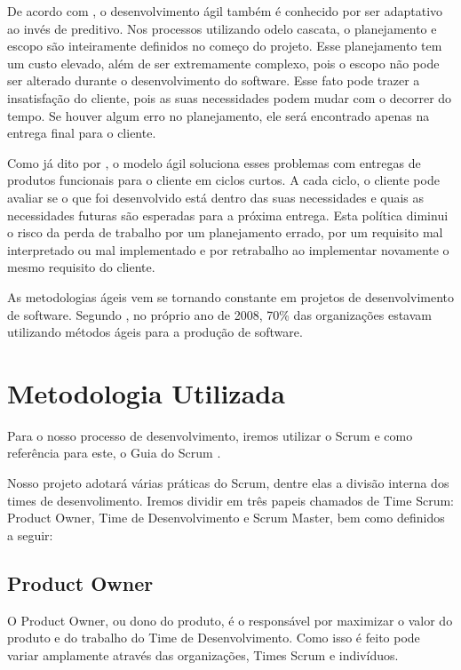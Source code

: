 De acordo com \cite{soares}, o desenvolvimento ágil também é
conhecido por ser adaptativo ao invés de preditivo. Nos processos utilizando
odelo cascata, o planejamento e escopo são inteiramente definidos no começo
do projeto. Esse planejamento tem um custo elevado, além de ser extremamente
complexo, pois o escopo não pode ser alterado durante o desenvolvimento do
software. Esse fato pode trazer a insatisfação do cliente, pois as suas
necessidades podem mudar com o decorrer do tempo. Se houver algum erro no
planejamento, ele será encontrado apenas na entrega final para o cliente.

Como já dito por \cite{pressman}, o modelo ágil soluciona esses
problemas com entregas de produtos funcionais para o cliente em ciclos curtos. A
cada ciclo, o cliente pode avaliar se o que foi desenvolvido está dentro das suas
necessidades e quais as necessidades futuras são esperadas para a próxima
entrega. Esta política diminui o risco da perda de trabalho por um planejamento
errado, por um requisito mal interpretado ou mal implementado e por retrabalho
ao implementar novamente o mesmo requisito do cliente.

As metodologias ágeis vem se tornando constante em projetos de
desenvolvimento de software. Segundo \cite{dubakov}, no
próprio ano de 2008, 70\% das organizações estavam utilizando métodos ágeis
para a produção de software.

\section{Metodologia Utilizada}
\label{sec:Metodologia Utilizada}

Para o nosso processo de desenvolvimento, iremos utilizar o Scrum e como referência para
este, o Guia do Scrum \cite{guiaScrum}.

Nosso projeto adotará várias práticas do Scrum, dentre elas a divisão interna dos times de
desenvolimento. Iremos dividir em três papeis chamados de Time Scrum: Product Owner, Time de Desenvolvimento
 e Scrum Master, bem como definidos a seguir:

 \subsection{Product Owner}
 \label{subs:Product Owner}
O Product Owner, ou dono do produto, é o responsável por maximizar o valor do produto e do
trabalho do Time de Desenvolvimento. Como isso é feito pode variar amplamente através das
organizações, Times Scrum e indivíduos.

